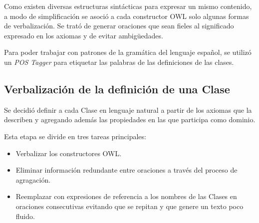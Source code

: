 Como existen diversas estructuras sintácticas para expresar un mismo contenido, a modo de simplificación se asoció a cada constructor OWL solo algunas formas de verbalización. Se trató de generar oraciones que sean fieles al significado expresado en los axiomas y de evitar ambigüedades.

Para poder trabajar con patrones de la gramática del lenguaje español, se utilizó un \emph{POS Tagger} para etiquetar las palabras de las definiciones de las clases.

\subsection{Verbalización de la definición de una Clase}
Se decidió definir a cada Clase en lenguaje natural a partir de los axiomas que la describen y agregando además las propiedades en las que participa como dominio.

Esta etapa se divide en tres tareas principales:
\begin{itemize}
    \item Verbalizar los constructores OWL.
    \item Eliminar información redundante entre oraciones a través del proceso de agragación.
    \item Reemplazar con expresiones de referencia a los nombres de las Clases en oraciones consecutivas evitando que se repitan y que genere un texto poco fluido.
\end{itemize}

